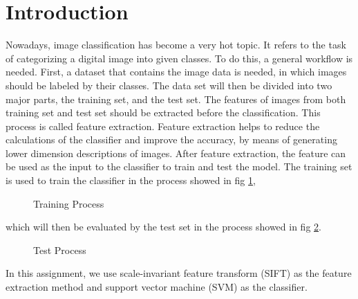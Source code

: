 \section{Introduction}
Nowadays, image classification has become a very hot topic. 
It refers to the task of categorizing a digital image into given classes. 
To do this, a general workflow is needed.
First, a dataset that contains the image data is needed, in which images should be labeled by their classes. 
The data set will then be divided into two major parts, the training set, and the test set.
The features of images from both training set and test set should be extracted before the classification.
This process is called feature extraction.
Feature extraction helps to reduce the calculations of the classifier and improve the accuracy, 
by means of generating lower dimension descriptions of images.
After feature extraction, the feature can be used as the input to the classifier to train and test the model.
The training set is used to train the classifier in the process showed in fig \ref{fig:proc:train}, 
\begin{figure}[H]
  \centering
  \caption{Training Process}
  \label{fig:proc:train}
\end{figure}
which will then be evaluated by the test set in the process showed in fig \ref{fig:proc:test}.

\begin{figure}[H]
\centering
  \caption{Test Process}
  \label{fig:proc:test} %
\end{figure}

In this assignment, we use scale-invariant feature transform (SIFT) as the feature extraction method and support vector machine (SVM) as the classifier.


